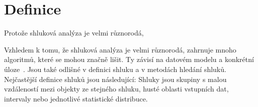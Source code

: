 \section{Definice}

Protože shluková analýza je velmi různorodá, 

Vzhledem k tomu, že shluková analýza je velmi různorodá, zahrnuje mnoho algoritmů, které se mohou značně lišit. Ty závisí na datovém modelu a konkrétní úloze~\cite{Aggarwal13}. Jsou také odlišné v definici shluku a v metodách hledání shluků. Nejčastější definice shluků jsou následující: Shluky jsou skupiny s malou vzdáleností mezi objekty ze stejného shluku, husté oblasti vstupních dat, intervaly nebo jednotlivé statistické distribuce.\\


